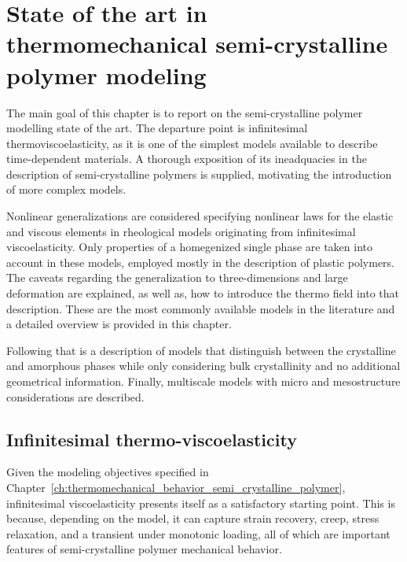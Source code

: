\chapter{State of the art in thermomechanical semi-crystalline polymer modeling} \label{ch:modeling_semi_crystalline_polymer}

The main goal of this chapter is to report on the semi-crystalline polymer modelling state of the art.
The departure point is infinitesimal thermoviscoelasticity, as it is one of the simplest models available to describe time-dependent materials.
A thorough exposition of its ineadquacies in the description of semi-crystalline polymers is supplied, motivating the introduction of more complex models.

Nonlinear generalizations are considered specifying nonlinear laws for the elastic and viscous elements in rheological models originating from infinitesimal viscoelasticity.
Only properties of a homegenized single phase are taken into account in these models, employed mostly in the description of plastic polymers.
The caveats regarding the generalization to three-dimensions and large deformation are explained, as well as, how to introduce the thermo field into that description.
These are the most commonly available models in the literature and a detailed overview is provided in this chapter.

Following that is a description of models that distinguish between the crystalline and amorphous phases while only considering bulk crystallinity and no additional geometrical information.
Finally, multiscale models with micro and mesostructure considerations are described.

\section{Infinitesimal thermo-viscoelasticity}
\label{sec:infinitesimal_thermo_viscoelasticity}
Given the modeling objectives specified in Chapter~\ref{ch:thermomechanical_behavior_semi_crystalline_polymer}, infinitesimal viscoelasticity presents itself as a satisfactory starting point.
This is because, depending on the model, it can capture strain recovery, creep, stress relaxation, and a transient under monotonic loading, all of which are important features of semi-crystalline polymer mechanical behavior.

